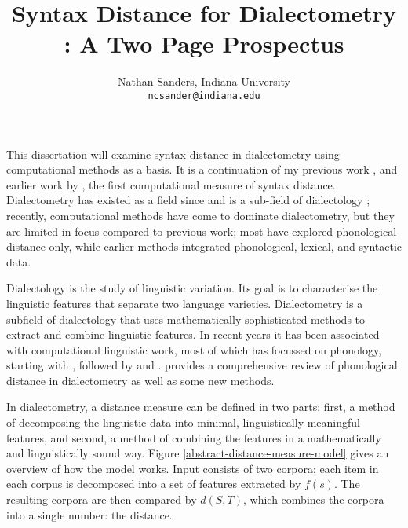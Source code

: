 \documentclass[11pt]{article}
\author{Nathan Sanders, Indiana University \\ \tt{ncsander@indiana.edu}}
\title{Syntax Distance for Dialectometry : A Two Page Prospectus}
\begin{document}
\maketitle

This dissertation will examine syntax distance in dialectometry using
computational methods as a basis. It is a continuation of my previous
work \cite{sanders07}, \cite{sanders08b} and earlier work by
, the first computational measure of syntax
distance. Dialectometry has existed as a field since
 and is a sub-field of dialectology
\cite{chambers92}; recently, computational methods have come to
dominate dialectometry, but they are limited in focus compared to
previous work; most have explored phonological distance only, while
earlier methods integrated phonological, lexical, and syntactic data.

Dialectology is the study of linguistic variation. %
Its goal is to characterise the linguistic features that
separate two language varieties. Dialectometry is a subfield of
dialectology that uses mathematically sophisticated methods to extract
and combine linguistic features. In recent years it has
been associated with computational linguistic work, most of which
has focussed on phonology, starting with
, followed by  and
.  provides a comprehensive
review of phonological distance in dialectometry as well as some new
methods.

In dialectometry, a distance measure can be defined in two parts:
first, a method of decomposing the linguistic data into minimal,
linguistically meaningful features, and second, a method of combining
the features in a mathematically and linguistically sound way. Figure
\ref{abstract-distance-measure-model} gives an overview of how the
model works. Input consists of two corpora; each item in each corpus
is decomposed into a set of features extracted by $f(s)$. The
resulting corpora are then compared by $d(S,T)$, which combines the
corpora into a single number: the distance.
\end{document}
